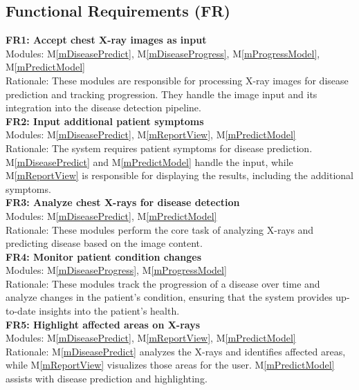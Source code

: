 \documentclass[12pt, titlepage]{article}
\newcommand{\mref}[1]{M\ref{#1}}
\begin{document}
\subsection{Functional Requirements (FR)}
\textbf{FR1: Accept chest X-ray images as input} \\
Modules: \mref{mDiseasePredict}, \mref{mDiseaseProgress}, \mref{mProgressModel}, \mref{mPredictModel} \\
Rationale: These modules are responsible for processing X-ray images for disease prediction and tracking progression. They handle the image input and its integration into the disease detection pipeline. \\
\newline
\textbf{FR2: Input additional patient symptoms} \\
Modules: \mref{mDiseasePredict}, \mref{mReportView}, \mref{mPredictModel} \\
Rationale: The system requires patient symptoms for disease prediction. \mref{mDiseasePredict} and \mref{mPredictModel} handle the input, while \mref{mReportView} is responsible for displaying the results, including the additional symptoms. \\
\newline
\textbf{FR3: Analyze chest X-rays for disease detection} \\
Modules: \mref{mDiseasePredict}, \mref{mPredictModel} \\
Rationale: These modules perform the core task of analyzing X-rays and predicting disease based on the image content. \\
\newline
\textbf{FR4: Monitor patient condition changes} \\
Modules: \mref{mDiseaseProgress}, \mref{mProgressModel} \\
Rationale: These modules track the progression of a disease over time and analyze changes in the patient’s condition, ensuring that the system provides up-to-date insights into the patient's health. \\
\newline
\textbf{FR5: Highlight affected areas on X-rays} \\
Modules: \mref{mDiseasePredict}, \mref{mReportView}, \mref{mPredictModel} \\
Rationale: \mref{mDiseasePredict} analyzes the X-rays and identifies affected areas, while \mref{mReportView} visualizes those areas for the user. \mref{mPredictModel} assists with disease prediction and highlighting. \\
\end{document}
